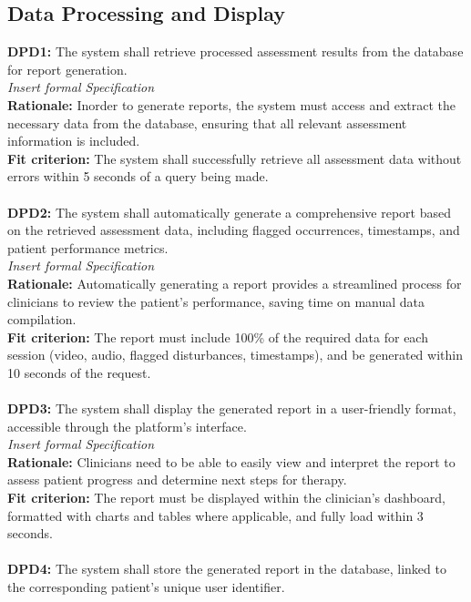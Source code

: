 \documentclass[12pt]{article}
\begin{document}
\subsection{Data Processing and Display}
\textbf{DPD1: }The system shall retrieve processed assessment results from the database for report generation.\\
\textit{Insert formal Specification}\\
\textbf{Rationale: }Inorder to generate reports, the system must access and extract the necessary data from the database, ensuring that all relevant assessment information is included.\\
\textbf{Fit criterion: }The system shall successfully retrieve all assessment data without errors within 5 seconds of a query being made.\\
\\
\noindent\textbf{DPD2: }The system shall automatically generate a comprehensive report based on the retrieved assessment data, including flagged occurrences, timestamps, and patient performance metrics.\\
\textit{Insert formal Specification}\\
\textbf{Rationale: }Automatically generating a report provides a streamlined process for clinicians to review the patient’s performance, saving time on manual data compilation.\\
\textbf{Fit criterion: }The report must include 100\% of the required data for each session (video, audio, flagged disturbances, timestamps), and be generated within 10 seconds of the request.\\
\\
\noindent\textbf{DPD3: }The system shall display the generated report in a user-friendly format, accessible through the platform’s interface.\\
\textit{Insert formal Specification}\\
\textbf{Rationale: }Clinicians need to be able to easily view and interpret the report to assess patient progress and determine next steps for therapy.\\
\textbf{Fit criterion: }The report must be displayed within the clinician's dashboard, formatted with charts and tables where applicable, and fully load within 3 seconds.\\
\\
\noindent\textbf{DPD4: }The system shall store the generated report in the database, linked to the corresponding patient’s unique user identifier.\\
\end{document}
